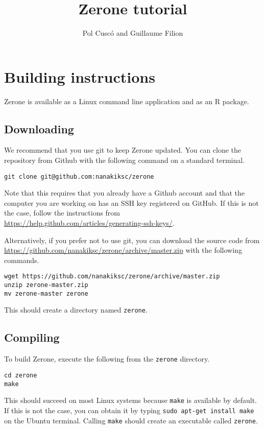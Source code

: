 \documentclass[12pt]{article}
\title{Zerone tutorial}
\author{Pol Cusc\'o and Guillaume Filion}
\begin{document}
\maketitle

\section{Building instructions}

Zerone is available as a Linux command line application and as an R package.

\subsection{Downloading}

We recommend that you use git to keep Zerone updated. You can clone the
repository from Github with the following command on a standard terminal.

\begin{verbatim}
git clone git@github.com:nanakiksc/zerone
\end{verbatim}

Note that this requires that you already have a Github account
and that the computer you are working on has an SSH key registered
on GitHub. If this is not the case, follow the instructions from
\url{https://help.github.com/articles/generating-ssh-keys/}.

Alternatively, if you prefer not to use git, you can download the source code
from \url{https://github.com/nanakiksc/zerone/archive/master.zip} with the
following commands.

\begin{verbatim}
wget https://github.com/nanakiksc/zerone/archive/master.zip
unzip zerone-master.zip
mv zerone-master zerone
\end{verbatim}

This should create a directory named \texttt{zerone}.

\subsection{Compiling}

To build Zerone, execute the following from the \texttt{zerone} directory.

\begin{verbatim}
cd zerone
make
\end{verbatim}

This should succeed on most Linux systems because \texttt{make} is
available by default. If this is not the case, you can obtain it by
typing \texttt{sudo apt-get install make} on the Ubuntu terminal.
Calling \texttt{make} should create an executable called \texttt{zerone}.
\end{document}
